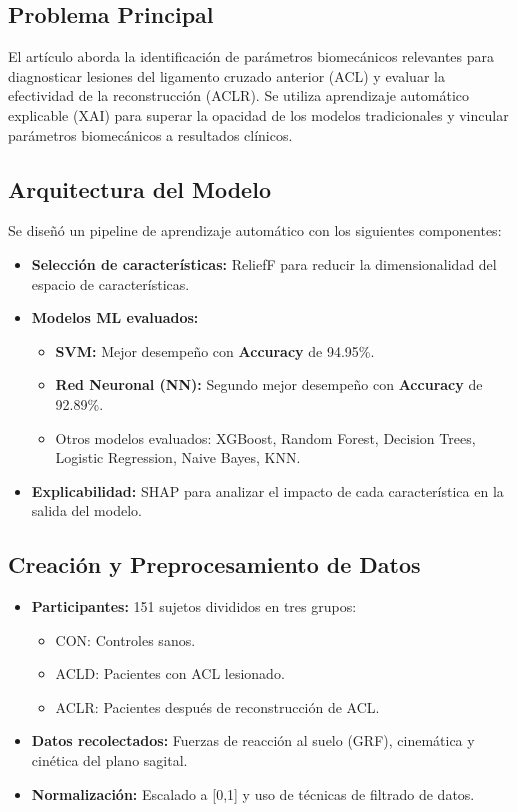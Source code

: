 \documentclass{report}
\begin{document}
\subsection{Problema Principal}
El artículo aborda la identificación de parámetros biomecánicos relevantes para diagnosticar lesiones del ligamento cruzado anterior (ACL) y evaluar la efectividad de la reconstrucción (ACLR). Se utiliza aprendizaje automático explicable (XAI) para superar la opacidad de los modelos tradicionales y vincular parámetros biomecánicos a resultados clínicos.

\subsection{Arquitectura del Modelo}
Se diseñó un pipeline de aprendizaje automático con los siguientes componentes:
\begin{itemize}
    \item \textbf{Selección de características:} ReliefF para reducir la dimensionalidad del espacio de características.
    \item \textbf{Modelos ML evaluados:}
    \begin{itemize}
        \item \textbf{SVM:} Mejor desempeño con \textbf{Accuracy} de 94.95\%.
        \item \textbf{Red Neuronal (NN):} Segundo mejor desempeño con \textbf{Accuracy} de 92.89\%.
        \item Otros modelos evaluados: XGBoost, Random Forest, Decision Trees, Logistic Regression, Naive Bayes, KNN.
    \end{itemize}
    \item \textbf{Explicabilidad:} SHAP para analizar el impacto de cada característica en la salida del modelo.
\end{itemize}

\subsection{Creación y Preprocesamiento de Datos}
\begin{itemize}
    \item \textbf{Participantes:} 151 sujetos divididos en tres grupos:
    \begin{itemize}
        \item CON: Controles sanos.
        \item ACLD: Pacientes con ACL lesionado.
        \item ACLR: Pacientes después de reconstrucción de ACL.
    \end{itemize}
    \item \textbf{Datos recolectados:} Fuerzas de reacción al suelo (GRF), cinemática y cinética del plano sagital.
    \item \textbf{Normalización:} Escalado a [0,1] y uso de técnicas de filtrado de datos.
\end{itemize}
\end{document}

